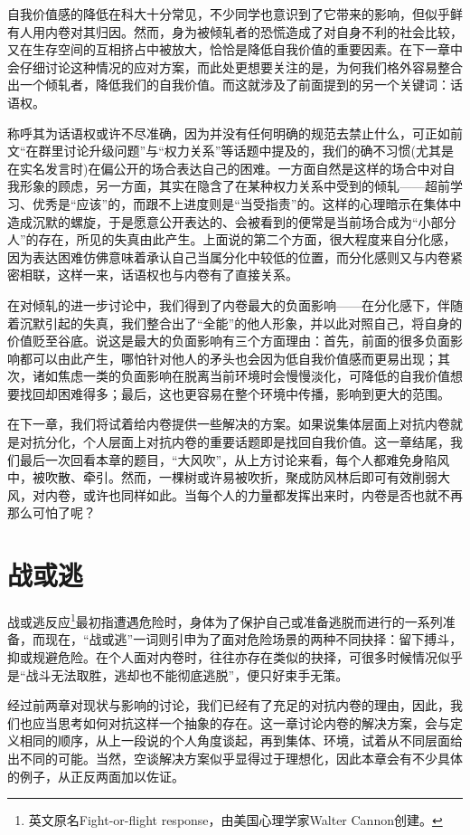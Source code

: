 \documentclass[UTF8,a4paper,fontset=windows,11pt,openany]{ctexbook}
\begin{document}
自我价值感的降低在科大十分常见，不少同学也意识到了它带来的影响，但似乎鲜有人用内卷对其归因。然而，身为被倾轧者的恐慌造成了对自身不利的社会比较，又在生存空间的互相挤占中被放大，恰恰是降低自我价值的重要因素。在下一章中会仔细讨论这种情况的应对方案，而此处更想要关注的是，为何我们格外容易整合出一个倾轧者，降低我们的自我价值。而这就涉及了前面提到的另一个关键词：话语权。

称呼其为话语权或许不尽准确，因为并没有任何明确的规范去禁止什么，可正如前文“在群里讨论升级问题”与“权力关系”等话题中提及的，我们的确不习惯(尤其是在实名发言时)在偏公开的场合表达自己的困难。一方面自然是这样的场合中对自我形象的顾虑，另一方面，其实在隐含了在某种权力关系中受到的倾轧——超前学习、优秀是“应该”的，而跟不上进度则是“当受指责”的。这样的心理暗示在集体中造成沉默的螺旋，于是愿意公开表达的、会被看到的便常是当前场合成为“小部分人”的存在，所见的失真由此产生。上面说的第二个方面，很大程度来自分化感，因为表达困难仿佛意味着承认自己当属分化中较低的位置，而分化感则又与内卷紧密相联，这样一来，话语权也与内卷有了直接关系。

在对倾轧的进一步讨论中，我们得到了内卷最大的负面影响——在分化感下，伴随着沉默引起的失真，我们整合出了“全能”的他人形象，并以此对照自己，将自身的价值贬至谷底。说这是最大的负面影响有三个方面理由：首先，前面的很多负面影响都可以由此产生，哪怕针对他人的矛头也会因为低自我价值感而更易出现；其次，诸如焦虑一类的负面影响在脱离当前环境时会慢慢淡化，可降低的自我价值想要找回却困难得多；最后，这也更容易在整个环境中传播，影响到更大的范围。

在下一章，我们将试着给内卷提供一些解决的方案。如果说集体层面上对抗内卷就是对抗分化，个人层面上对抗内卷的重要话题即是找回自我价值。这一章结尾，我们最后一次回看本章的题目，“大风吹”，从上方讨论来看，每个人都难免身陷风中，被吹散、牵引。然而，一棵树或许易被吹折，聚成防风林后即可有效削弱大风，对内卷，或许也同样如此。当每个人的力量都发挥出来时，内卷是否也就不再那么可怕了呢？

\chapter{战或逃}
战或逃反应\footnote{英文原名Fight-or-flight response，由美国心理学家Walter Cannon创建。}最初指遭遇危险时，身体为了保护自己或准备逃脱而进行的一系列准备，而现在，“战或逃”一词则引申为了面对危险场景的两种不同抉择：留下搏斗，抑或规避危险。在个人面对内卷时，往往亦存在类似的抉择，可很多时候情况似乎是“战斗无法取胜，逃却也不能彻底逃脱”，便只好束手无策。

经过前两章对现状与影响的讨论，我们已经有了充足的对抗内卷的理由，因此，我们也应当思考如何对抗这样一个抽象的存在。这一章讨论内卷的解决方案，会与定义相同的顺序，从上一段说的个人角度谈起，再到集体、环境，试着从不同层面给出不同的可能。当然，空谈解决方案似乎显得过于理想化，因此本章会有不少具体的例子，从正反两面加以佐证。
\end{document}
